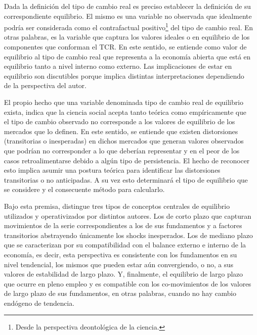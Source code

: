 \documentclass[12pt,letterpaper]{article}
\begin{document}
Dada la definición del tipo de cambio real es preciso establecer la definición de su correspondiente equilibrio. El mismo es una variable no observada que idealmente podría ser considerada como el contrafactual positivo\footnote{Desde la perspectiva deontológica de la ciencia.} del tipo de cambio real. En otras palabras, es la variable que captura los valores ideales o en equilibrio de los componentes que conforman el TCR. En este sentido, se entiende como valor de equilibrio al tipo de cambio real que representa a la economía abierta que está en equilibrio tanto a nivel interno como externo. Las implicaciones de estar en equilibrio son discutibles porque implica distintas interpretaciones dependiendo de la perspectiva del autor.

El propio hecho que una variable denominada tipo de cambio real de equilibrio exista, indica que la ciencia social acepta tanto teórica como empíricamente que el tipo de cambio observado no corresponde a los valores de equilibrio de los mercados que lo definen. En este sentido, se entiende que existen distorsiones (transitorias o inesperadas) en dichos mercados que generan valores observados que podrían no corresponder a lo que deberían representar y en el peor de los casos retroalimentarse debido a algún tipo de persistencia. El hecho de reconocer esto implica asumir una postura teórica para identificar las distorsiones transitorias o no anticipadas. A su vez esto determinará el tipo de equilibrio que se considere y el consecuente método para calcularlo.

Bajo esta premisa, \cite{driver2005concepts} distingue tres tipos de conceptos centrales de equilibrio utilizados y operativizados por distintos autores. Los de corto plazo que capturan movimientos de la serie correspondientes a los de sus fundamentos y a factores transitorios abstrayendo únicamente los shocks inesperados. Los de mediano plazo que se caracterizan por su compatibilidad con el balance externo e interno de la economía, es decir, esta perspectiva es consistente con los fundamentos en su nivel tendencial, los mismos que pueden estar aún convergiendo, o no, a sus valores de estabilidad de largo plazo. Y, finalmente, el equilibrio de largo plazo que ocurre en pleno empleo y es compatible con los co-movimientos de los valores de largo plazo de sus fundamentos, en otras palabras, cuando no hay cambio endógeno de tendencia.
\end{document}
